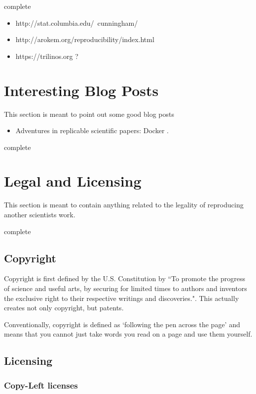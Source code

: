\documentclass[american]{article}
\newcommand{\complete}{
	\gls{complete}
}
\begin{document}
\complete

\begin{itemize}
\item http://stat.columbia.edu/~cunningham/
\item http://arokem.org/reproducibility/index.html
\item https://trilinos.org ?
\end{itemize}

\section{Interesting Blog Posts}

This section is meant to point out some good blog posts

\begin{itemize}
\item Adventures in replicable scientific papers: Docker \cite{titus-brown-docker}.
\end{itemize}

\complete

\section{Legal and Licensing}

This section is meant to contain anything related to the legality of reproducing another scientists work.

\complete

\subsection{Copyright}

Copyright is first defined by the U.S. Constitution by \cite[art.~I, \S~8, cl.~8]{USConst} ``To promote the progress of science and useful arts, by securing for limited times to authors and inventors the exclusive right to their respective writings and discoveries.". This actually creates not only copyright, but patents.

Conventionally, copyright is defined as `following the pen across the page' and means that you cannot just take words you read on a page and use them yourself.

\subsection{Licensing}

\subsubsection{Copy-Left licenses}
\end{document}
